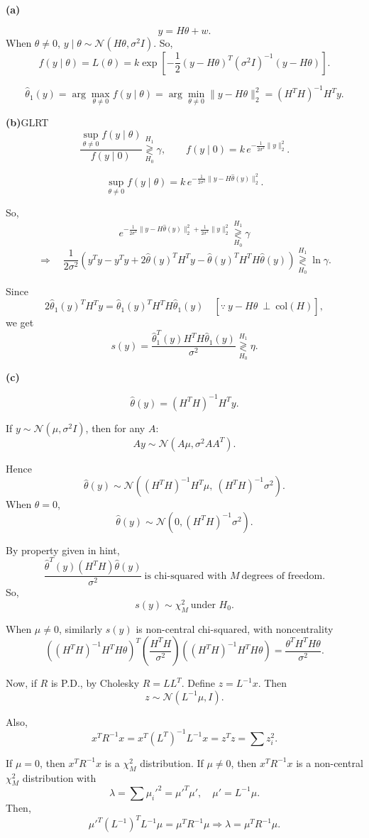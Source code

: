 \documentclass[12pt,a4paper,onecolumn]{exam}
\begin{document}
\begin{solution}

\textbf{(a)}

\[
y=H\theta+w.
\]
When $\theta\ne0$, $y\mid\theta\sim\mathcal{N}(H\theta,\sigma^2 I)$.
So,
\[
f(y\mid\theta)=L(\theta)=k\exp\left[-\frac{1}{2}(y-H\theta)^T(\sigma^2 I)^{-1}(y-H\theta)\right].
\]

\[
\hat\theta_1(y)=\arg\max_{\theta\ne0}f(y\mid\theta)
=\arg\min_{\theta\ne0}\|y-H\theta\|_2^2
=(H^TH)^{-1}H^Ty.
\]

\textbf{(b)}\quad GLRT
\[
\frac{\sup_{\theta\ne0}f(y\mid\theta)}{f(y\mid0)}\underset{H_0}{\overset{H_1}{\gtrless}}\gamma,
\qquad
f(y\mid0)=k\,e^{-\frac{1}{2\sigma^2}\|y\|_2^2}.
\]

\[
\sup_{\theta\ne0}f(y\mid\theta)=k\,e^{-\frac{1}{2\sigma^2}\|y-H\hat\theta(y)\|_2^2}.
\]

So,
\[
e^{-\frac{1}{2\sigma^2}\|y-H\hat\theta(y)\|_2^2+\frac{1}{2\sigma^2}\|y\|_2^2}
\underset{H_0}{\overset{H_1}{\gtrless}}\gamma
\]
\[
\Rightarrow\quad
\frac{1}{2\sigma^2}\left(y^Ty-y^Ty+2\hat\theta(y)^TH^Ty-\hat\theta(y)^TH^TH\hat\theta(y)\right)
\underset{H_0}{\overset{H_1}{\gtrless}}\ln\gamma.
\]

Since
\[
2\hat\theta_1(y)^TH^Ty=\hat\theta_1(y)^TH^TH\hat\theta_1(y)
\quad [\because\ y-H\hat\theta\ \perp\ \text{col}(H)],
\]
we get
\[
s(y)=\frac{\hat\theta_1^T(y)H^TH\hat\theta_1(y)}{\sigma^2}
\underset{H_0}{\overset{H_1}{\gtrless}}\eta.
\]

\textbf{(c)}

\[
\hat\theta(y)=(H^TH)^{-1}H^Ty.
\]

If $y\sim\mathcal{N}(\mu,\sigma^2 I)$, then for any $A$:
\[
Ay\sim\mathcal{N}(A\mu,\sigma^2 AA^T).
\]

Hence
\[
\hat\theta(y)\sim\mathcal{N}\left((H^TH)^{-1}H^T\mu,\ (H^TH)^{-1}\sigma^2\right).
\]
When $\theta=0$,
\[
\hat\theta(y)\sim\mathcal{N}\left(0,(H^TH)^{-1}\sigma^2\right).
\]

By property given in hint,
\[
\frac{\hat\theta^T(y)(H^TH)\hat\theta(y)}{\sigma^2}
\ \text{is chi-squared with }M\ \text{degrees of freedom.}
\]
So,
\[
s(y)\sim\chi_M^2\ \text{under }H_0.
\]

When $\mu\ne0$, similarly $s(y)$ is non-central chi-squared, with noncentrality
\[
\left((H^TH)^{-1}H^TH\theta\right)^T
\left(\frac{H^TH}{\sigma^2}\right)
\left((H^TH)^{-1}H^TH\theta\right)
=\frac{\theta^TH^TH\theta}{\sigma^2}.
\]

Now, if $R$ is P.D., by Cholesky $R=LL^T$.
Define $z=L^{-1}x$.
Then
\[
z\sim\mathcal{N}(L^{-1}\mu,I).
\]

Also,
\[
x^TR^{-1}x=x^T(L^T)^{-1}L^{-1}x=z^Tz=\sum z_i^2.
\]

If $\mu=0$, then $x^TR^{-1}x$ is a $\chi_M^2$ distribution.
If $\mu\ne0$, then $x^TR^{-1}x$ is a non-central $\chi_M^2$ distribution with
\[
\lambda=\sum \mu_i'^2=\mu'^T\mu',\quad \mu'=L^{-1}\mu.
\]
Then,
\[
\mu'^T(L^{-1})^TL^{-1}\mu=\mu^TR^{-1}\mu
\Rightarrow \lambda=\mu^TR^{-1}\mu.
\]

\end{solution}
\end{document}
